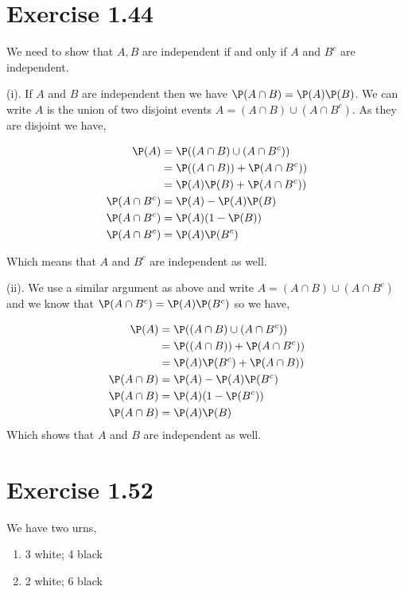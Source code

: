\documentclass[a4paper]{report}
\begin{document}
\section*{Exercise 1.44}

We need to show that $A, B$ are independent if and only if $A$ and  $B^{c}$ are independent.

(i). If $A$ and $B$ are independent then we have $\P(A \cap B) = \P(A) \P(B)$. We can write $A$ is the union of two disjoint events $A = (A \cap B) \cup (A \cap B^{c})$. As they are disjoint we have, 

\begin{align*}
    \P(A) &= \P((A \cap B) \cup (A \cap B^{c}))\\
          &=  \P((A \cap B)) + \P(A \cap B^{c}))\\
          &=  \P(A)\P(B) + \P(A \cap B^{c}))\\
    \P(A \cap B^{c}) &= \P(A) -  \P(A)\P(B) \\
    \P(A \cap B^{c}) &= \P(A)(1 - \P(B)) \\
    \P(A \cap B^{c}) &= \P(A)\P(B^{c}) \\
\end{align*}

Which means that $A$ and $B^{c}$ are independent as well. 


(ii). We use a similar argument as above and write $A = (A \cap B) \cup (A \cap B^{c})$ and we know that $\P(A \cap B^{c}) = \P(A) \P(B^{c})$ so we have, 

\begin{align*}
    \P(A) &= \P((A \cap B) \cup (A \cap B^{c}))\\
          &=  \P((A \cap B)) + \P(A \cap B^{c}))\\
          &=  \P(A)\P(B^{c}) + \P(A \cap B))\\
    \P(A \cap B) &= \P(A) -  \P(A)\P(B^{c}) \\
    \P(A \cap B) &= \P(A)(1 - \P(B^{c})) \\
    \P(A \cap B) &= \P(A)\P(B) \\
\end{align*}
Which shows that $A$ and $B$ are independent as well.

\section*{Exercise 1.52}
We have two urns, 
\begin{enumerate}
    \item 3 white; 4 black
    \item 2 white; 6 black
\end{enumerate}
\end{document}
